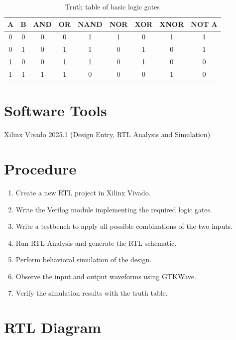 \documentclass[12pt,a4paper]{report}
\begin{document}
\begin{table}[H]
    \centering
    \begin{tabular}{|c|c|c|c|c|c|c|c|c|}
        \hline
        \textbf{A} & \textbf{B} & \textbf{AND} & \textbf{OR} & \textbf{NAND} & \textbf{NOR} & \textbf{XOR} & \textbf{XNOR} & \textbf{NOT A} \\
        \hline
        0 & 0 & 0 & 0 & 1 & 1 & 0 & 1 & 1 \\
        \hline
        0 & 1 & 0 & 1 & 1 & 0 & 1 & 0 & 1 \\
        \hline
        1 & 0 & 0 & 1 & 1 & 0 & 1 & 0 & 0 \\
        \hline
        1 & 1 & 1 & 1 & 0 & 0 & 0 & 1 & 0 \\
        \hline
    \end{tabular}
    \caption{Truth table of basic logic gates}
    \label{tab:basic_logic_gates}
\end{table}

\section{Software Tools}

Xilinx Vivado 2025.1 (Design Entry, RTL Analysis and Simulation)

\section{Procedure}

\begin{enumerate}
    \item Create a new RTL project in Xilinx Vivado.
    \item Write the Verilog module implementing the required logic gates.
    \item Write a testbench to apply all possible combinations of the two inputs.
    \item Run RTL Analysis and generate the RTL schematic.
    \item Perform behavioral simulation of the design.
    \item Observe the input and output waveforms using GTKWave.
    \item Verify the simulation results with the truth table.
\end{enumerate}



\section{RTL Diagram}
\end{document}

